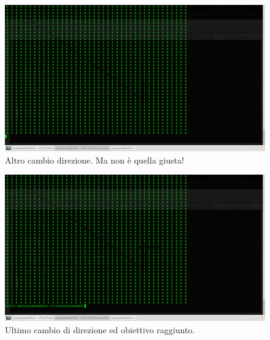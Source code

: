 \begin{figure}[hb]
\center
\includegraphics[width=\textwidth]{immagini/Run7.png}
\caption{Altro cambio direzione. Ma non è quella giusta!}
\end{figure}

\begin{figure}[hb]
\center
\includegraphics[width=\textwidth]{immagini/Run8.png}
\caption{Ultimo cambio di direzione ed obiettivo raggiunto.}
\end{figure}